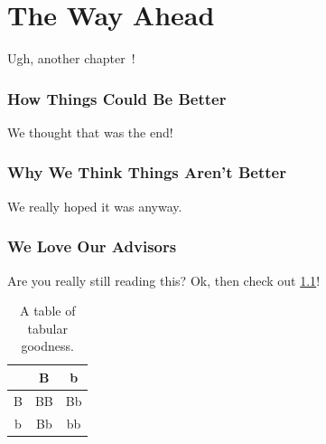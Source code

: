 \documentclass[letterpaper,12pt]{article}
\begin{document}
\chapter{The Way Ahead}
Ugh, another chapter~\cite{ref:D}!

\subsection{How Things Could Be Better}
We thought that was the end!

\subsection{Why We Think Things Aren't Better}
We really hoped it was anyway.

\subsection{We Love Our Advisors}
Are you really still reading this? Ok, then check out \ref{tab:magic}!

\begin{table}
	\caption{\label{tab:magic} A table of tabular goodness.}
	\begin{center}
		\begin{tabular}{|c|c|c|}
			\hline
			& B & b \\
			\hline
			B & BB & Bb \\
			\hline
			b & Bb & bb \\
			\hline
		\end{tabular}
	\end{center}
\end{table}
\end{document}
